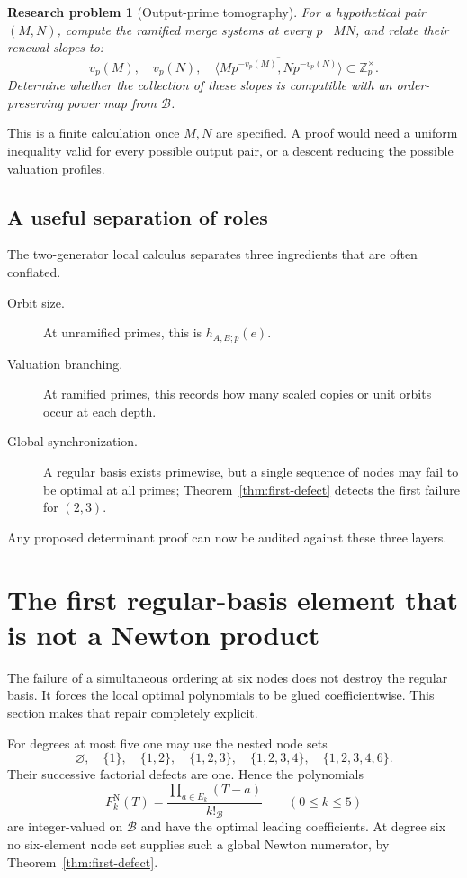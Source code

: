 \documentclass[11pt,oneside]{article}
\newtheorem{problem}[theorem]{Research problem}
\theoremstyle{definition}
\theoremstyle{remark}
\newcommand{\Z}{\mathbb Z}
\newcommand{\B}{\mathcal B}
\begin{document}
\begin{problem}[Output-prime tomography]
\label{prob:output-tomography}
For a hypothetical pair \((M,N)\), compute the ramified merge systems at every
\(p\mid MN\), and relate their renewal slopes to:
\[
 v_p(M),\quad v_p(N),\quad
 \overline{\langle M p^{-v_p(M)},N p^{-v_p(N)}\rangle}\subset\Z_p^\times.
\]
Determine whether the collection of these slopes is compatible with an order-preserving power
map from \(\B\).
\end{problem}

This is a finite calculation once \(M,N\) are specified.  A proof would need a uniform
inequality valid for every possible output pair, or a descent reducing the possible valuation
profiles.

\subsection{A useful separation of roles}

The two-generator local calculus separates three ingredients that are often conflated.

\begin{description}
\item[Orbit size.] At unramified primes, this is \(h_{A,B;p}(e)\).
\item[Valuation branching.] At ramified primes, this records how many scaled copies or unit
orbits occur at each depth.
\item[Global synchronization.] A regular basis exists primewise, but a single sequence of
nodes may fail to be optimal at all primes; Theorem~\ref{thm:first-defect} detects the first
failure for \((2,3)\).
\end{description}

Any proposed determinant proof can now be audited against these three layers.

\section{The first regular-basis element that is not a Newton product}
\label{sec:first-nonnewton}

The failure of a simultaneous ordering at six nodes does not destroy the regular basis.  It
forces the local optimal polynomials to be glued coefficientwise.  This section makes that
repair completely explicit.

For degrees at most five one may use the nested node sets
\[
 \varnothing,
 \quad\{1\},
 \quad\{1,2\},
 \quad\{1,2,3\},
 \quad\{1,2,3,4\},
 \quad\{1,2,3,4,6\}.
\]
Their successive factorial defects are one.  Hence the polynomials
\begin{equation}
 F_k^{\mathrm N}(T)
 =\frac{\prod_{a\in E_k}(T-a)}{k!_{\B}}
 \qquad(0\le k\le5)
 \label{eq:newton-through-five}
\end{equation}
are integer-valued on \(\B\) and have the optimal leading coefficients.
At degree six no six-element node set supplies such a global Newton numerator, by
Theorem~\ref{thm:first-defect}.
\end{document}
